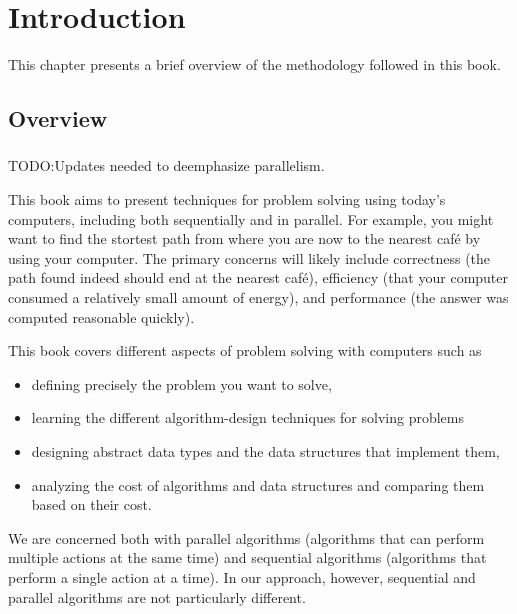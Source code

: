 \chapter{Introduction}
\label{ch:intro}

This chapter presents a brief overview of the methodology followed in
this book. 

\section{Overview}

\subsection{}
\begin{teachnote}
TODO:Updates needed to deemphasize parallelism.
\end{teachnote}

\begin{gram} 
This book aims to present techniques for problem solving using today's
computers, including both sequentially and in parallel.
%
For example, you might want to find the stortest path from where you
are now to the nearest caf\'e by using your computer.
%
The primary concerns will likely include correctness (the path found
indeed should end at the nearest caf\'e), 
%
efficiency (that your computer consumed a relatively small amount of
energy), and performance (the answer was computed reasonable quickly).
%

This book covers different aspects of problem solving with computers
such as 
\begin{itemize}
\item defining precisely the problem you want to solve,
\item learning the different algorithm-design techniques for solving problems
\item designing abstract data types and the data structures that
  implement them,
%
\item analyzing the cost of algorithms and data structures and
  comparing them based on their cost.
%
\end{itemize}

We are concerned both with 
%
parallel algorithms (algorithms that can perform multiple actions at
the same time)
%
and 
%
sequential algorithms (algorithms that perform a single action at a
time).
%
In our approach, however, sequential and parallel algorithms are not
particularly different.
%
\end{gram}


